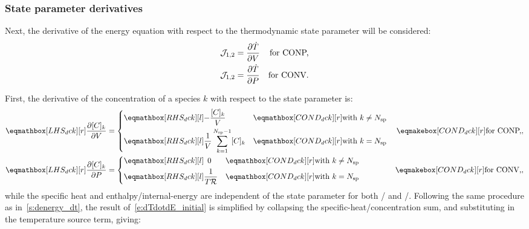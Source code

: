 \documentclass[12pt,number,sort&compress]{elsarticle}
\begin{document}
\subsubsection{State parameter derivatives}
Next, the derivative of the energy equation with respect to the thermodynamic state parameter will be considered:
\begin{subequations}
\label{e:dTdotdE_initial}
\begin{align}
 \mathcal{J}_{1, 2} & = \frac{\partial\dot{T}}{\partial{V}} & \text{\dconp/,} \\
 \mathcal{J}_{1, 2} & = \frac{\partial\dot{T}}{\partial{P}} & \text{\dconv/.}
\end{align}
\end{subequations}

First, the derivative of the concentration of a species $k$ with respect to the state parameter is:
\begin{subequations}
 \label{e:dck_de}
 \begin{align}
 \lhs{dck}{\frac{\partial [C]_{k} }{\partial V }} &=
  \begin{dcases}
  \rhs{dck}{-\frac{[C]_{k}}{V}} & \mathcond{dck}{\text{with }k \ne \ns/} \\
  \rhs{dck}{\frac{1}{V} \sum_{k=1}^{\ns/  - 1} [C]_{k}} & \mathcond{dck}{\text{with }k = \ns/}
 \end{dcases}&\cond{dck}{\dconp/,} \\
 \lhs{dck}{\frac{\partial [C]_{k} }{\partial P }} &=
 \begin{dcases}
   \rhs{dck}{\mathindent[s]0} & \mathcond{dck}{\text{with }k \ne \ns/} \\
   \rhs{dck}{\frac{1}{T \Ru/}} & \mathcond{dck}{\text{with }k = \ns/}
 \end{dcases}&\cond{dck}{\dconv/,}
 \end{align}
\end{subequations}
while the specific heat and enthalpy\slash internal-energy are independent of the state parameter for both \conp/ and \conv/.
Following the same procedure as in~\cref{s:denergy_dt}, the result of~\cref{e:dTdotdE_initial} is simplified by collapsing the specific-heat\slash concentration sum, and substituting in the temperature source term, giving:
\end{document}
